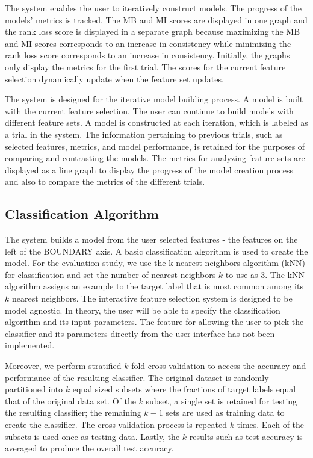 The system enables the user to iteratively construct models. The progress of the models' metrics is tracked. The MB and MI scores are displayed in one graph and the rank loss score is displayed in a separate graph because maximizing the MB and MI scores corresponds to an increase in consistency while minimizing the rank loss score corresponds to an increase in consistency. Initially, the graphs only display the metrics for the first trial. The scores for the current feature selection dynamically update when the feature set updates. 

The system is designed for the iterative model building process. A model is built with the current feature selection. The user can continue to build models with different feature sets. A model is constructed at each iteration, which is labeled as a trial in the system. The information pertaining to previous trials, such as selected features, metrics, and model performance, is retained for the purposes of comparing and contrasting the models. The metrics for analyzing feature sets are displayed as a line graph to display the progress of the model creation process and also to compare the metrics of the different trials.  

\subsection { Classification Algorithm }
The system builds a model from the user selected features - the features on the left of the BOUNDARY axis. A basic classification algorithm is used to create the model. For the evaluation study, we use the k-nearest neighbors algorithm (kNN) for classification and set the number of nearest neighbors $k$ to use as 3. The kNN algorithm assigns an example to the target label that is most common among its $k$ nearest neighbors. The interactive feature selection system is designed to be model agnostic. In theory, the user will be able to specify the classification algorithm and its input parameters. The feature for allowing the user to pick the classifier and its parameters directly from the user interface has not been implemented.

Moreover, we perform stratified $k$ fold cross validation to access the accuracy and performance of the resulting classifier. The original dataset is randomly partitioned into $k$ equal sized subsets where the fractions of target labels equal that of the original data set. Of the $k$ subset, a single set is retained for testing the resulting classifier; the remaining $k-1$ sets are used as training data to create the classifier. The cross-validation process is repeated $k$ times. Each of the subsets is used once as testing data. Lastly, the $k$ results such as test accuracy is averaged to produce the overall test accuracy.

